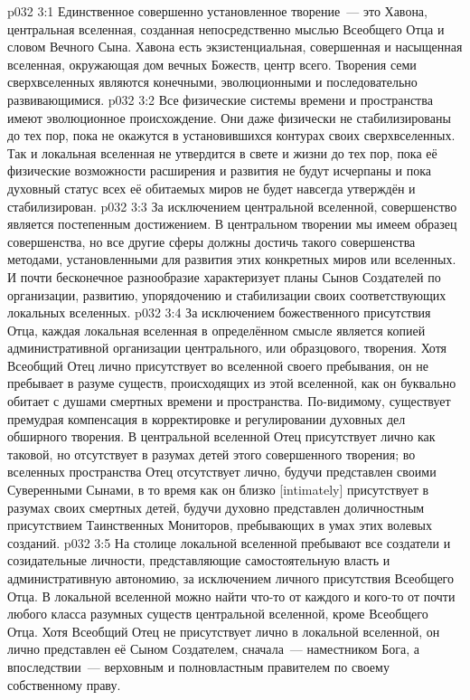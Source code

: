 \vs p032 3:1 Единственное совершенно установленное творение~--- это Хавона, центральная вселенная, созданная непосредственно мыслью Всеобщего Отца и словом Вечного Сына. Хавона есть экзистенциальная, совершенная и насыщенная вселенная, окружающая дом вечных Божеств, центр всего. Творения семи сверхвселенных являются конечными, эволюционными и последовательно развивающимися.
\vs p032 3:2 Все физические системы времени и пространства имеют эволюционное происхождение. Они даже физически не стабилизированы до тех пор, пока не окажутся в установившихся контурах своих сверхвселенных. Так и локальная вселенная не утвердится в свете и жизни до тех пор, пока её физические возможности расширения и развития не будут исчерпаны и пока духовный статус всех её обитаемых миров не будет навсегда утверждён и стабилизирован.
\vs p032 3:3 За исключением центральной вселенной, совершенство является постепенным достижением. В центральном творении мы имеем образец совершенства, но все другие сферы должны достичь такого совершенства методами, установленными для развития этих конкретных миров или вселенных. И почти бесконечное разнообразие характеризует планы Сынов Создателей по организации, развитию, упорядочению и стабилизации своих соответствующих локальных вселенных.
\vs p032 3:4 \pc За исключением божественного присутствия Отца, каждая локальная вселенная в определённом смысле является копией административной организации центрального, или образцового, творения. Хотя Всеобщий Отец лично присутствует во вселенной своего пребывания, он не пребывает в разуме существ, происходящих из этой вселенной, как он буквально обитает с душами смертных времени и пространства. По\hyp{}видимому, существует премудрая компенсация в корректировке и регулировании духовных дел обширного творения. В центральной вселенной Отец присутствует лично как таковой, но отсутствует в разумах детей этого совершенного творения; во вселенных пространства Отец отсутствует лично, будучи представлен своими Суверенными Сынами, в то время как он близко [intimately] присутствует в разумах своих смертных детей, будучи духовно представлен доличностным присутствием Таинственных Мониторов, пребывающих в умах этих волевых созданий.
\vs p032 3:5 На столице локальной вселенной пребывают все создатели и созидательные личности, представляющие самостоятельную власть и административную автономию, за исключением личного присутствия Всеобщего Отца. В локальной вселенной можно найти что-то от каждого и кого-то от почти любого класса разумных существ центральной вселенной, кроме Всеобщего Отца. Хотя Всеобщий Отец не присутствует лично в локальной вселенной, он лично представлен её Сыном Создателем, сначала~--- наместником Бога, а впоследствии~--- верховным и полновластным правителем по своему собственному праву.
